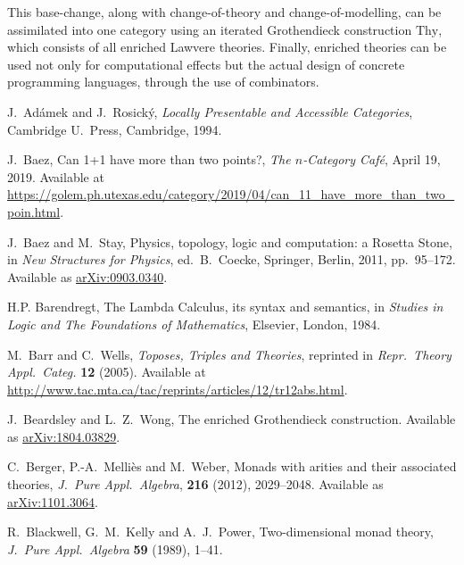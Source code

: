 \documentclass{amsart}
\theoremstyle{definition}
\begin{document}
This base-change, along with change-of-theory and change-of-modelling, can be assimilated into one category using an iterated Grothendieck construction $\mathrm{Thy}$, which consists of all enriched Lawvere theories. Finally, enriched theories can be used not only for computational effects but the actual design of concrete programming languages, through the use of combinators.

\begin{thebibliography}{100}

 J.\ Ad\'{a}mek and J.\ Rosick\'{y}, \textsl{Locally Presentable and Accessible Categories}, Cambridge U.\ Press, Cambridge, 1994.

 J.\ Baez, Can 1+1 have more than two points?, \textsl{The $n$-Category Caf\'e}, April 19, 2019.   Available at \href{https://golem.ph.utexas.edu/category/2019/04/can_11_have_more_than_two_poin.html}{https://golem.ph.utexas.edu/category/2019/04/can\_11\_have\_more\_than\_two\_poin.html}.

 J.\ Baez and M.\ Stay, Physics, topology, logic and computation: a Rosetta Stone, in \textsl{New Structures for Physics}, ed.\ B.\ Coecke, Springer, Berlin, 2011, pp.\ 95--172.  Available as \href{https://arxiv.org/abs/0903.0340}{arXiv:0903.0340}.

 H.P. Barendregt, The Lambda Calculus, its syntax and semantics, in \textsl{Studies in Logic and The Foundations of Mathematics}, Elsevier, London, 1984.
	
 M.\ Barr and C.\ Wells, \textsl{Toposes, Triples and Theories}, reprinted in \textsl{Repr.\ Theory Appl.\ Categ.} \textbf{12} (2005).   Available at \href{http://www.tac.mta.ca/tac/reprints/articles/12/tr12abs.html}{http://www.tac.mta.ca/tac/reprints/articles/12/tr12abs.html}.

 J.\ Beardsley and L.\ Z.\ Wong, The enriched Grothendieck construction.  Available as \href{https://arxiv.org/abs/1804.03829}{arXiv:1804.03829}.
	
 C.\ Berger, P.-A.\ Melli\`es and M.\ Weber, Monads with arities and their associated theories, \textsl{J.\ Pure Appl.\ Algebra}, \textbf{216} (2012), 2029--2048.  Available as \href{https://arxiv.org/abs/1101.3064}{arXiv:1101.3064}.

 R.\ Blackwell, G.\ M.\ Kelly and A.\ J.\ Power, Two-dimensional monad theory, 
\textsl{J.\ Pure Appl.\ Algebra} \textbf{59} (1989), 1--41. 
 

\end{thebibliography}
\end{document}
